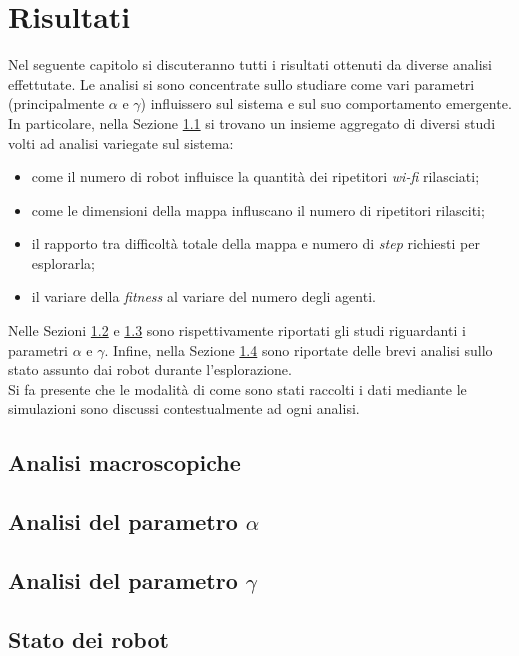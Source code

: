 \chapter{Risultati}
\label{chap:results}
Nel seguente capitolo si discuteranno tutti i risultati ottenuti da diverse analisi effettutate.
Le analisi si sono concentrate sullo studiare come vari parametri (principalmente $\alpha$ e $\gamma$) influissero sul sistema e sul suo comportamento emergente.
In particolare, nella Sezione \ref{sec:results-macro} si trovano un insieme aggregato di diversi studi volti ad analisi variegate sul sistema:\begin{itemize}
	\item come il numero di robot influisce la quantità dei ripetitori \textit{wi-fi} rilasciati;
	\item come le dimensioni della mappa influscano il numero di ripetitori rilasciti;
	\item il rapporto tra difficoltà totale della mappa e numero di \textit{step} richiesti per esplorarla;
	\item il variare della \textit{fitness} al variare del numero degli agenti.
\end{itemize}
Nelle Sezioni \ref{sec:alpha} e \ref{sec:gamma} sono rispettivamente riportati gli studi riguardanti i parametri $\alpha$ e $\gamma$.
Infine, nella Sezione \ref{sec:status} sono riportate delle brevi analisi sullo stato assunto dai robot durante l'esplorazione.\\
Si fa presente che le modalità di come sono stati raccolti i dati mediante le simulazioni sono discussi contestualmente ad ogni analisi.
\section{Analisi macroscopiche}
\label{sec:results-macro}

\section{Analisi del parametro $\alpha$}
\label{sec:alpha}

\section{Analisi del parametro $\gamma$}
\label{sec:gamma}

\section{Stato dei robot}
\label{sec:status}
